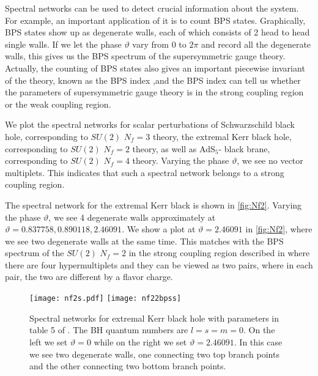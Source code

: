 \documentclass[11pt]{article}
\numberwithin{equation}{section}
\begin{document}
%

Spectral networks can be used to detect crucial information about the system. For example, an important application of it is to count BPS states. Graphically, BPS states show up as 
%
degenerate walls, each of which consists of 2 head to head single walls. 
If we let the phase $\vartheta$ vary from $0$ to $2\pi$ and record all the degenerate walls, this gives us the BPS spectrum of the supersymmetric gauge theory.
%
Actually, the counting of BPS states 
also gives an important piecewise invariant of the theory, known as the BPS index \cite{Gaiotto:2009hg,Hollands:2016kgm,Hao:2019ryd},and
the BPS index can tell us whether the parameters of supersymmetric gauge theory is in the strong coupling region or the weak coupling region.  


We plot the spectral networks for scalar perturbations of  
Schwarzschild black hole, corresponding to $SU(2)$ $N_f=3$ theory,  the extremal Kerr black hole, corresponding to $SU(2)$ $N_f=2$ theory, as well as   AdS$_5$- black brane, corresponding to $SU(2)$ $N_f=4$ theory. Varying the phase $\vartheta$, we see no vector multiplets. This indicates that such a spectral network belongs to a strong coupling region. 

The spectral network for the extremal Kerr black  is shown in \autoref{fig:Nf2}. Varying the phase $\vartheta$, we see 4 degenerate walls approximately at $\vartheta=0.837758, 0.890118, 2.46091$. We show a plot at $\vartheta=2.46091$ in \autoref{fig:Nf2}, where we see two degenerate walls at the same time. This matches with the BPS spectrum of the $SU(2)$ $N_f=2$ in the strong coupling region described in  \cite[Sec.~10.3]{Gaiotto:2009hg} where there are four hypermultiplets and they can be viewed as two pairs, where in each pair, the two are different by a flavor charge. 

\begin{figure}
    \centering
    \texttt{[image: nf2s.pdf]} \qquad \texttt{[image: nf22bpss]}
    \caption{Spectral networks for extremal Kerr black hole with parameters in table 5 of \cite{Aminov:2020yma}. The BH quantum numbers are $l=s=m=0$. On the left we set  $\vartheta=0$ while on the right we set $\vartheta=2.46091$. In this case we see two degenerate walls, one connecting two top branch points and the other connecting two bottom branch points. }
    \label{fig:Nf2}
\end{figure}
\end{document}
